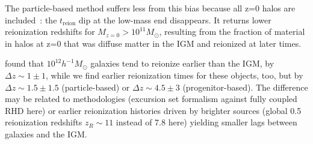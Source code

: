 \documentclass[twocolumn]{aastex61}
\begin{document}
The particle-based method suffers less from this bias because all z=0 halos are included~: the $t_\mathrm{reion}$ dip at the low-mass end disappears. It returns lower reionization redshifts for $M_{z=0}>10^{11} M_\odot$, resulting from the fraction of material in halos at z=0 that was diffuse matter in the IGM and reionized at later times.

\citet{LI14} found that $10^{12} h^{-1} M_\odot$ galaxies tend to reionize earlier than the IGM, by $\Delta z\sim 1\pm1$, while we find earlier reionization times for these objects, too, but by $\Delta z\sim 1.5\pm 1.5$ (particle-based) or $\Delta z\sim 4.5\pm 3$ (progenitor-based). The difference may be related to methodologies (excursion set formalism against fully coupled RHD here) or earlier reionization histories driven by brighter sources (global 0.5 reionization redshifts $z_R\sim 11$ instead of 7.8 here) yielding smaller lags between galaxies and the  IGM.

\end{document}
